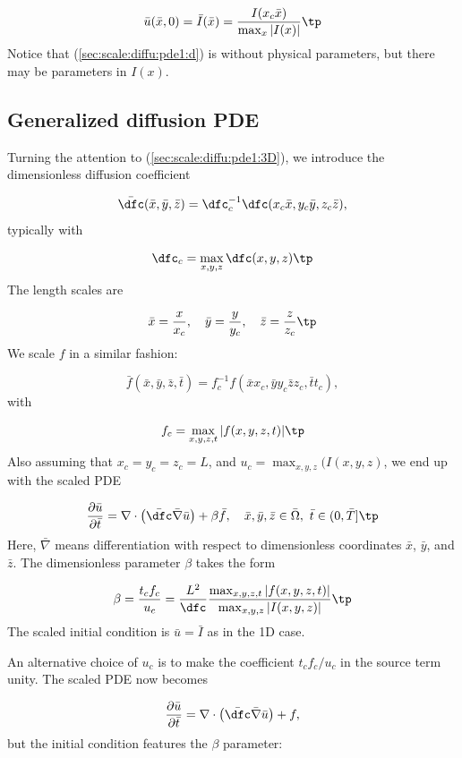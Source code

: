 \documentclass[graybox,envcountchap,sectrefs,final]{svmonodo}
\begin{document}
\[ \bar u(\bar x, 0) = \bar I(\bar x) = \frac{I(x_c\bar x)}{\max_x |I(x)|}\tp\]
Notice that (\ref{sec:scale:diffu:pde1:d}) is without physical parameters,
but there may be parameters in $I(x)$.

\subsection{Generalized diffusion PDE}

Turning the attention to (\ref{sec:scale:diffu:pde1:3D}), we introduce
the dimensionless diffusion coefficient

\[ \bar\dfc(\bar x,\bar y,\bar z) =
\dfc_c^{-1}\dfc (x_c\bar x, y_c\bar y, z_c\bar z),\]
typically with

\[ \dfc_c = \max_{x,y,z}\dfc(x,y,z)\tp\]
The length scales are

\[ \bar x = \frac{x}{x_c},\quad \bar y = \frac{y}{y_c},\quad
\bar z = \frac{z}{z_c}\tp
\]
We scale $f$ in a similar fashion:

\[ \bar f(\bar x, \bar y, \bar z, \bar t)
= f_c^{-1}f(\bar xx_c, \bar yy_c \bar zz_c, \bar tt_c),\]
with

\[ f_c = \max_{x,y,z,t}|f(x,y,z,t)|\tp\]
Also assuming
that $x_c=y_c=z_c=L$, and $u_c=\max_{x,y,z}(I(x,y,z)$,
we end up with the scaled PDE

\begin{equation}
\frac{\partial \bar u}{\partial \bar t} =
\nabla\cdot\left(\bar\dfc \bar\nabla \bar u\right) + \beta\bar f, \quad  \bar x,\bar y,\bar z\in \bar \Omega,\ \bar t\in (0,\bar T]\tp
\label{sec:scale:diffu:pde1:3D:d}
\end{equation}
Here, $\bar\nabla$ means differentiation with respect to dimensionless
coordinates $\bar x$, $\bar y$, and $\bar z$. The dimensionless parameter
$\beta$ takes the form

\[ \beta = \frac{t_cf_c}{u_c} = \frac{L^2}{\dfc}
\frac{\max_{x,y,z,t}|f(x,y,z,t)|}{\max_{x,y,z}|I(x,y,z)|}\tp\]
The scaled initial condition is $\bar u = \bar I$ as in the 1D case.

An alternative choice of $u_c$ is to make the coefficient $t_cf_c/u_c$
in the source term unity. The scaled PDE now becomes

\begin{equation}
\frac{\partial \bar u}{\partial \bar t} =
\nabla\cdot\left(\bar\dfc \bar\nabla \bar u\right) + f,
\label{sec:scale:diffu:pde1:3D:d2}
\end{equation}
but the initial condition features the $\beta$ parameter:
\end{document}
